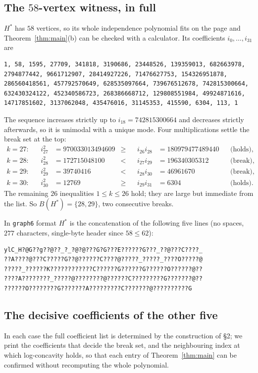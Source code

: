 \documentclass[11pt]{amsart}
\theoremstyle{definition}
\theoremstyle{remark}
\begin{document}
\subsection*{The $58$-vertex witness, in full}
$H^*$ has $58$ vertices, so its whole independence polynomial fits on the page and
Theorem~\ref{thm:main}(b) can be checked with a calculator. Its coefficients
$i_0,\dots,i_{31}$ are
{\footnotesize
\begin{verbatim}
1, 58, 1595, 27709, 341818, 3190686, 23448526, 139359013, 682663978,
2794877442, 9661712907, 28414927226, 71476627753, 154326951878,
286560418561, 457792570649, 628535097664, 739676512678, 742815300664,
632430324122, 452340586723, 268386668712, 129808551984, 49924871616,
14717851602, 3137062048, 435476016, 31145353, 415590, 6304, 113, 1
\end{verbatim}}
\noindent
The sequence increases strictly up to $i_{18}=742815300664$ and decreases strictly
afterwards, so it is unimodal with a unique mode. Four multiplications settle the
break set at the top:
\begin{align*}
 k=27:&& i_{27}^2&=970033013494609 &\ge&& i_{26}i_{28}&=180979477489440 &&\text{(holds)},\\
 k=28:&& i_{28}^2&=172715048100 &<&& i_{27}i_{29}&=196340305312 &&\text{(break)},\\
 k=29:&& i_{29}^2&=39740416 &<&& i_{28}i_{30}&=46961670 &&\text{(break)},\\
 k=30:&& i_{30}^2&=12769 &\ge&& i_{29}i_{31}&=6304 &&\text{(holds)}.
\end{align*}
The remaining $26$ inequalities $1\le k\le26$ hold; they are large but immediate from
the list. So $B(H^*)=\{28,29\}$, two consecutive breaks.

In \texttt{graph6} format $H^*$ is the concatenation of the following five lines (no
spaces, $277$ characters, single-byte header since $58\le62$):
{\footnotesize
\begin{verbatim}
ylC_H?@G??g??@??_?_?@?@???G?G???E??????G???_??@???C????_
??A????@???C?????G??@??????C????@?????_?????_????O?????@
?????_??????K????????????C??????G??????G??????O??????@??
????A????????_?????@????????@??????C?????????G???????@??
??????O????????G???????A?????????C???????@??????????G
\end{verbatim}}

\subsection*{The decisive coefficients of the other five}
In each case the full coefficient list is determined by the construction of \S2; we
print the coefficients that decide the break set, and the neighbouring index at which
log-concavity holds, so that each entry of Theorem~\ref{thm:main} can be confirmed
without recomputing the whole polynomial.
\end{document}
